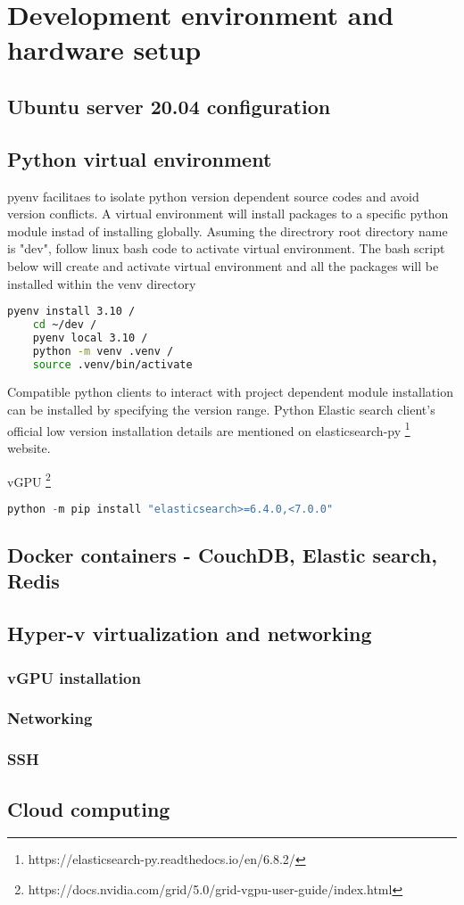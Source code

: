 \chapter{Development environment and hardware setup}

\section {Ubuntu server 20.04 configuration}

\section {Python virtual environment} \label {pyenv}

pyenv facilitaes to isolate python version dependent source codes and avoid version conflicts. A virtual environment will install packages to a specific python module instad of installing globally. Asuming the directrory root directory name is "dev", follow linux bash code to activate virtual environment. 
The bash script below will create and activate virtual environment and all the packages will be installed within the venv directory
\begin{lstlisting}[language=bash]
    pyenv install 3.10 /
    cd ~/dev /
    pyenv local 3.10 /
    python -m venv .venv /
    source .venv/bin/activate

\end{lstlisting}

Compatible python clients to interact with project dependent module installation can be installed by specifying the version range.
Python Elastic search client's official low version installation details are mentioned on elasticsearch-py \footnote{https://elasticsearch-py.readthedocs.io/en/6.8.2/} website.

vGPU \footnote{https://docs.nvidia.com/grid/5.0/grid-vgpu-user-guide/index.html}

\begin{lstlisting}[language=Python]
    python -m pip install "elasticsearch>=6.4.0,<7.0.0"
\end{lstlisting}

\section {Docker containers - CouchDB, Elastic search, Redis}

\section {Hyper-v virtualization and networking}

\subsection{vGPU installation}

\subsection{Networking}

\subsection{SSH}


\section{Cloud computing}

